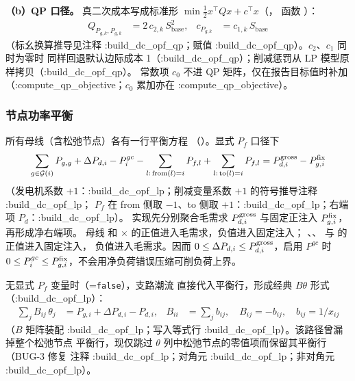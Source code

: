 \textbf{（b）QP 口径。} 真二次成本写成标准形
$\min \tfrac12 x^{\top}Qx+c^{\top}x$（，
函数 ）：
\begin{align*}
Q_{P_{g,k},P_{g,k}} &= 2\,c_{2,k}\,S_{\mathrm{base}}^{2},
& c_{P_{g,k}} &= c_{1,k}\,S_{\mathrm{base}}
\end{align*}
（标幺换算推导见注释 :build\_dc\_opf\_qp；赋值 :build\_dc\_opf\_qp）。$c_2$、$c_1$ 同时为零时
同样回退默认边际成本 1（:build\_dc\_opf\_qp）；削减惩罚从 LP 模型原样拷贝（:build\_dc\_opf\_qp）。
常数项 $c_0$ 不进 QP 矩阵，仅在报告目标值时补加
（:compute\_qp\_objective；$c_0$ 累加亦在 :compute\_qp\_objective）。

\subsubsection*{节点功率平衡}
所有母线（含松弛节点）各有一行平衡方程
（）。显式 $P_f$ 口径下
\begin{align*}
\sum_{g\in\mathcal{G}(i)} P_{g,g} + \Delta P_{d,i}-P^{gc}_i
- \sum_{l:\,\mathrm{from}(l)=i} P_{f,l} + \sum_{l:\,\mathrm{to}(l)=i} P_{f,l}
= P^{\rm gross}_{d,i}-P^{\rm fix}_{g,i}
\end{align*}
（发电机系数 $+1$：:build\_dc\_opf\_lp；削减变量系数 $+1$ 的符号推导注释 :build\_dc\_opf\_lp；
$P_f$ 在 from 侧取 $-1$、to 侧取 $+1$：:build\_dc\_opf\_lp；右端项 $P_d$：:build\_dc\_opf\_lp）。
实现先分别聚合毛需求 $P^{\rm gross}_{d,i}$ 与固定正注入 $P^{\rm fix}_{g,i}$，再形成净右端项。
母线  和 $\times$ 的正值进入毛需求，负值进入固定注入；
、、 与  的正值进入固定注入，
负值进入毛需求。因而 $0\le\Delta P_{d,i}\le P^{\rm gross}_{d,i}$，启用 $P^{gc}$ 时
$0\le P^{gc}_i\le P^{\rm fix}_{g,i}$，不会用净负荷错误压缩可削负荷上界。

无显式 $P_f$ 变量时（=\texttt{false}），支路潮流
直接代入平衡行，形成经典 $B\theta$ 形式（:build\_dc\_opf\_lp）：
\begin{align*}
\sum_{j} B_{ij}\,\theta_j &= P_{g,i}+\Delta P_{d,i}-P_{d,i},
& B_{ii} &= \textstyle\sum_{j} b_{ij},\quad B_{ij}=-b_{ij},\quad b_{ij}=1/x_{ij}
\end{align*}
（$B$ 矩阵装配 :build\_dc\_opf\_lp；写入等式行 :build\_dc\_opf\_lp）。该路径曾漏掉整个松弛节点
平衡行，现仅跳过 $\theta$ 列中松弛节点的零值项而保留其平衡行（BUG-3 修复
注释 :build\_dc\_opf\_lp；对角元 :build\_dc\_opf\_lp；非对角元 :build\_dc\_opf\_lp）。

